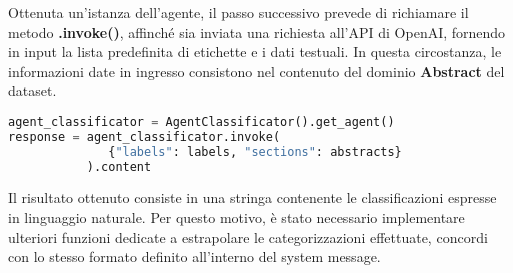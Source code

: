Ottenuta un'istanza dell'agente, il passo successivo prevede di richiamare il metodo \textbf{.invoke()}, affinché sia inviata una richiesta all'API di OpenAI, fornendo in input la lista predefinita di etichette e i dati testuali. In questa circostanza, le informazioni date in ingresso consistono nel contenuto del dominio \textbf{Abstract} del dataset.
\begin{lstlisting}[language=python, caption=Invocazione e recupero della classificazione dall'agente]
agent_classificator = AgentClassificator().get_agent()
response = agent_classificator.invoke(
              {"labels": labels, "sections": abstracts}
           ).content
\end{lstlisting}
Il risultato ottenuto consiste in una stringa contenente le classificazioni espresse in linguaggio naturale. Per questo motivo, è stato necessario implementare ulteriori funzioni dedicate a estrapolare le categorizzazioni effettuate, concordi con lo stesso formato definito all'interno del system message.